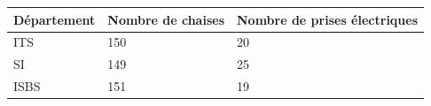 \begin{tabular}{|l|l|l|}
\hline
Département & Nombre de chaises & Nombre de prises électriques\\
\hline
\hline
ITS & 150 & 20\\
\hline
SI & 149 & 25 \\
\hline
ISBS & 151 & 19\\
\hline
\end{tabular}